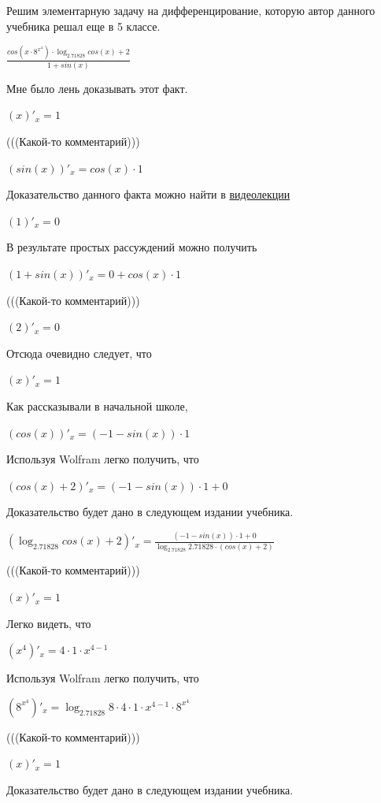\documentclass[12pt,a4paper,fleqn]{article}
\theoremstyle{definition}
\begin{document}
Решим элементарную задачу на дифференцирование, которую автор данного учебника решал еще в 5 классе.


$\frac{cos( x  \cdot { 8 }^{{ x }^{ 4 }}) \cdot \log_{ 2.71828 }{cos( x ) +  2 }}{ 1  + sin( x )}
$

Мне было лень доказывать этот факт.

$( x )'_{x} =  1 $

(((Какой-то комментарий))) 

$(sin( x ))'_{x} = cos( x ) \cdot  1 $

Доказательство данного факта можно найти в \href{https://www.youtube.com/watch?v=dQw4w9WgXcQ}{видеолекции} 

$( 1 )'_{x} =  0 $

В результате простых рассуждений можно получить 

$( 1  + sin( x ))'_{x} =  0  + cos( x ) \cdot  1 $

(((Какой-то комментарий))) 

$( 2 )'_{x} =  0 $

Отсюда очевидно следует, что 

$( x )'_{x} =  1 $

Как рассказывали в начальной школе, 

$(cos( x ))'_{x} = ( -1  - sin( x )) \cdot  1 $

Используя Wolfram легко получить, что 

$(cos( x ) +  2 )'_{x} = ( -1  - sin( x )) \cdot  1  +  0 $

Доказательство будет дано в следующем издании учебника. 

$(\log_{ 2.71828 }{cos( x ) +  2 })'_{x} = \frac{( -1  - sin( x )) \cdot  1  +  0 }{\log_{ 2.71828 }{ 2.71828 } \cdot (cos( x ) +  2 )}
$

(((Какой-то комментарий))) 

$( x )'_{x} =  1 $

Легко видеть, что 

$({ x }^{ 4 })'_{x} =  4  \cdot  1  \cdot { x }^{ 4  -  1 }$

Используя Wolfram легко получить, что 

$({ 8 }^{{ x }^{ 4 }})'_{x} = \log_{ 2.71828 }{ 8 } \cdot  4  \cdot  1  \cdot { x }^{ 4  -  1 } \cdot { 8 }^{{ x }^{ 4 }}$

(((Какой-то комментарий))) 

$( x )'_{x} =  1 $

Доказательство будет дано в следующем издании учебника. 
\end{document}
